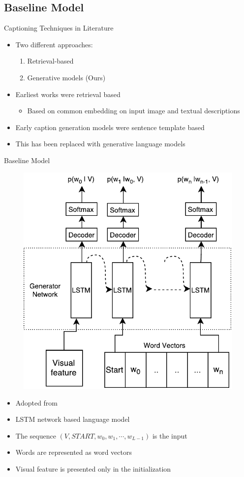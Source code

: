 \documentclass{beamer}
\begin{document}
\subsection{Baseline Model}
\begin{frame}{Captioning Techniques in Literature}
\begin{itemize}
  \item Two different approaches:
      \begin{enumerate}
        \item Retrieval-based 
        \item Generative models (Ours)
      \end{enumerate}
  \item Earliest works were retrieval based
          {\begin{itemize}
          \item Based on common embedding on input image and textual descriptions  
      \end{itemize}}
  \item Early caption generation models were sentence template based
  \item This has been replaced with generative language models 
\end{itemize} 
\end{frame}
\begin{frame}{Baseline Model}
    \begin{figure}[h]
        \centering
        \includegraphics[width=0.4\linewidth]{images/Thesis_lstmLangGen.pdf}
    \end{figure}
    \begin{itemize}
        \item Adopted from~\cite{Vinyals_2015_CVPR} 
        \item LSTM network based language model
        \item The sequence $(V,START,w_0, w_1, \cdots,w_{L-1})$ is the input
        \item Words are represented as word vectors 
        \item Visual feature is presented only in the initialization 
    \end{itemize}
\end{frame}
\end{document}
